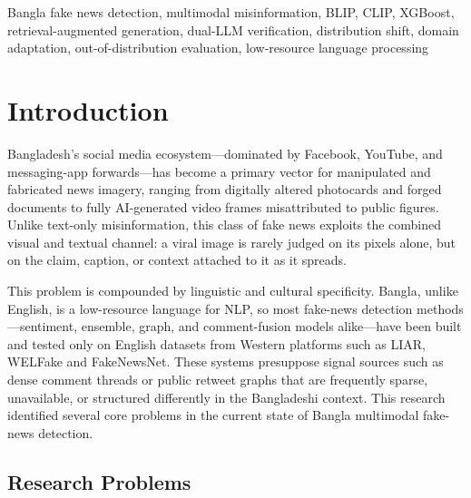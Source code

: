 \documentclass[conference,a4paper]{IEEEtran}
\begin{document}
\begin{IEEEkeywords}
Bangla fake news detection, multimodal misinformation, BLIP, CLIP, XGBoost,
retrieval-augmented generation, dual-LLM verification, distribution shift,
domain adaptation, out-of-distribution evaluation, low-resource language
processing
\end{IEEEkeywords}

\section{Introduction}

Bangladesh's social media ecosystem---dominated by Facebook, YouTube, and
messaging-app forwards---has become a primary vector for manipulated and
fabricated news imagery, ranging from digitally altered photocards and forged
documents to fully AI-generated video frames misattributed to public figures.
Unlike text-only misinformation, this class of fake news exploits the combined
visual and textual channel: a viral image is rarely judged on its pixels
alone, but on the claim, caption, or context attached to it as it spreads.

This problem is compounded by linguistic and cultural specificity. Bangla,
unlike English, is a low-resource language for NLP, so most fake-news
detection methods---sentiment, ensemble, graph, and comment-fusion models
alike---have been built and tested only on English datasets from Western
platforms such as LIAR, WELFake and FakeNewsNet. These systems presuppose
signal sources such as dense comment threads or public retweet graphs that are
frequently sparse, unavailable, or structured differently in the Bangladeshi
context. This research identified several core problems in the current state
of Bangla multimodal fake-news detection.

\subsection{Research Problems}
\end{document}

